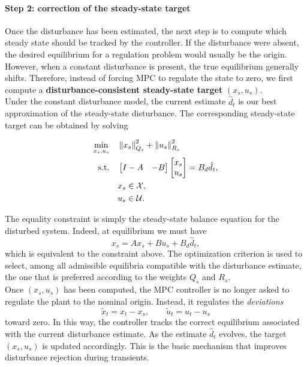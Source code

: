 \paragraph{Step 2: correction of the steady-state target}

Once the disturbance has been estimated, the next step is to compute which steady state should be tracked by the controller. If the disturbance were absent, the desired equilibrium for a regulation problem would usually be the origin. However, when a constant disturbance is present, the true equilibrium generally shifts. Therefore, instead of forcing MPC to regulate the state to zero, we first compute a \textbf{disturbance-consistent steady-state target} $(x_s,u_s).$\\
Under the constant disturbance model, the current estimate $\hat d_t$ is our best approximation of the steady-state disturbance. The corresponding steady-state target can be obtained by solving

\begin{theorembox}
\begin{align*}
\min_{x_s,u_s}\quad & \left\lVert x_s \right\rVert_{Q_s}^2 + \left\lVert u_s \right\rVert_{R_s}^2\\
\text{s.t.}\quad &
\begin{bmatrix}
I-A & -B
\end{bmatrix}
\begin{bmatrix}
x_s\\
u_s
\end{bmatrix}
=
B_d \hat d_t,\\
& x_s \in \mathcal{X},\\
& u_s \in \mathcal{U}.
\end{align*}
\end{theorembox}

The equality constraint is simply the steady-state balance equation for the disturbed system. Indeed, at equilibrium we must have
\[
x_s = Ax_s + Bu_s + B_d \hat d_t,
\]
which is equivalent to the constraint above. The optimization criterion is used to select, among all admissible equilibria compatible with the disturbance estimate, the one that is preferred according to the weights $Q_s$ and $R_s$.\\
Once $(x_s,u_s)$ has been computed, the MPC controller is no longer asked to regulate the plant to the nominal origin. Instead, it regulates the \emph{deviations}
\[
\tilde x_t = x_t-x_s,
\qquad
\tilde u_t = u_t-u_s
\]
toward zero. In this way, the controller tracks the correct equilibrium associated with the current disturbance estimate. As the estimate $\hat d_t$ evolves, the target $(x_s,u_s)$ is updated accordingly. This is the basic mechanism that improves disturbance rejection during transients.

